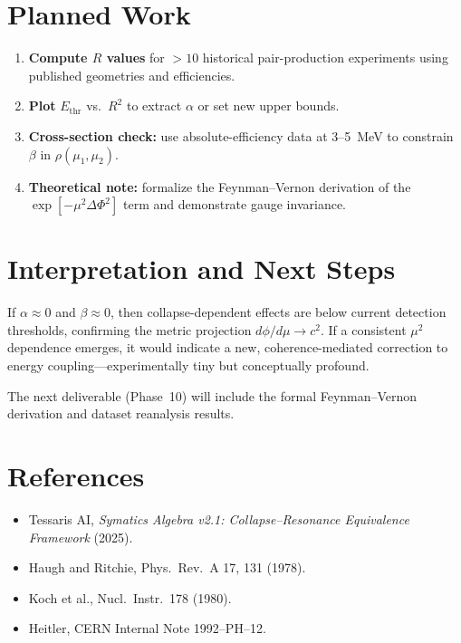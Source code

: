 \documentclass[12pt]{article}
\begin{document}
\section{Planned Work}

\begin{enumerate}[noitemsep]
  \item \textbf{Compute $R$ values} for $>10$ historical pair-production experiments using published geometries and efficiencies.
  \item \textbf{Plot} $E_{\text{thr}}$ vs.\ $R^2$ to extract $\alpha$ or set new upper bounds.
  \item \textbf{Cross-section check:} use absolute-efficiency data at 3--5~MeV to constrain $\beta$ in $\rho(\mu_1,\mu_2)$.
  \item \textbf{Theoretical note:} formalize the Feynman--Vernon derivation of the $\exp[-\mu^2\Delta\Phi^2]$ term and demonstrate gauge invariance.
\end{enumerate}

\section{Interpretation and Next Steps}

If $\alpha \approx 0$ and $\beta \approx 0$, then collapse-dependent effects are below current detection thresholds, confirming the metric projection $d\phi/d\mu \to c^2$.  
If a consistent $\mu^2$ dependence emerges, it would indicate a new, coherence-mediated correction to energy coupling—experimentally tiny but conceptually profound.

The next deliverable (Phase~10) will include the formal Feynman--Vernon derivation and dataset reanalysis results.

\section*{References}

\begin{itemize}[noitemsep]
  \item Tessaris AI, \emph{Symatics Algebra v2.1: Collapse--Resonance Equivalence Framework} (2025).
  \item Haugh and Ritchie, Phys.\ Rev.\ A 17, 131 (1978).
  \item Koch et al., Nucl.\ Instr.\ 178 (1980).
  \item Heitler, CERN Internal Note 1992--PH--12.
\end{itemize}
\end{document}
